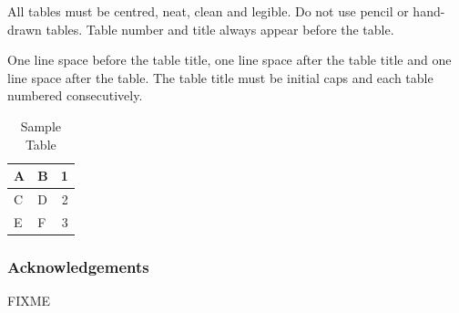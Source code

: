 \documentclass[a4paper]{article}
\begin{document}
All tables must be centred, neat, clean and legible. Do not use pencil
or hand-drawn tables. Table number and title always appear before the
table.

One line space before the table title, one line space after the table
title and one line space after the table. The table title must be
initial caps and each table numbered consecutively.

\begin{table}[ht]
\begin{center}
\caption{Sample Table}

\bigskip

\begin{tabular}{|l|l|r|}
\hline
A & B & 1\\ \hline
C & D & 2\\
E & F & 3\\ \hline
\end{tabular}
\end{center}
\end{table}


\subsubsection{Acknowledgements}

FIXME

 


%
%
%
\end{document}
